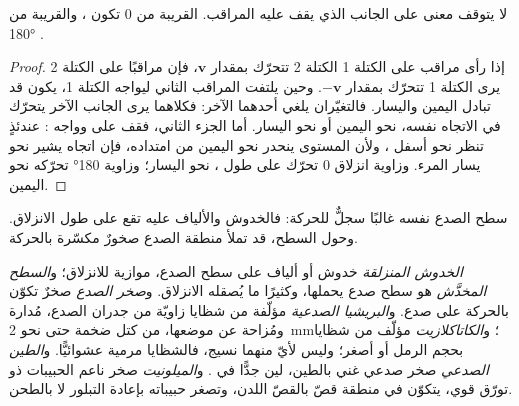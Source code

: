 \begin{proposition}\label{prop:b1:faults-folds-fabrics:sense}
لا يتوقف معنى  على الجانب الذي يقف عليه المراقب.  القريبة من $0$ تكون ، والقريبة من \ang{180} .
\end{proposition}

\begin{proof}
إذا رأى مراقب على الكتلة 1 الكتلة 2 تتحرّك بمقدار $\mathbf v$، فإن مراقبًا على الكتلة 2 يرى الكتلة 1 تتحرّك بمقدار $-\mathbf v$. وحين يلتفت المراقب الثاني ليواجه الكتلة 1، يكون قد تبادل اليمين واليسار. فالتغيّران يلغي أحدهما الآخر: فكلاهما يرى الجانب الآخر يتحرّك في الاتجاه نفسه، نحو اليمين أو نحو اليسار. أما الجزء الثاني، فقف على  وواجه : عندئذٍ تنظر نحو أسفل ، ولأن المستوى ينحدر نحو اليمين من امتداده، فإن اتجاه  يشير نحو يسار المرء. وزاوية انزلاق $0$ تحرّك  على طول ، نحو اليسار؛ وزاوية \ang{180} تحرّكه نحو اليمين.
\end{proof}

سطح الصدع نفسه غالبًا سجلٌّ للحركة: فالخدوش والألياف عليه تقع على طول الانزلاق. وحول السطح، قد تملأ منطقة الصدع صخورٌ مكسّرة بالحركة.

\begin{definition}\label{def:b1:faults-folds-fabrics:fault-rocks}
\emph{الخدوش المنزلقة} خدوش أو ألياف على سطح الصدع، موازية للانزلاق؛ و\emph{السطح المخدَّش} هو سطح صدع يحملها، وكثيرًا ما يُصقله الانزلاق. و\emph{صخر الصدع} صخرٌ تكوّن بالحركة على صدع. و\emph{البريشيا الصدعية} مؤلّفة من شظايا زاويّة من جدران الصدع، مُدارة ومُزاحة عن موضعها، من كتل ضخمة حتى نحو \qty{2}{mm}؛ و\emph{الكاتاكلازيت} مؤلّف من شظايا بحجم الرمل أو أصغر؛ وليس لأيّ منهما نسيج، فالشظايا مرمية عشوائيًّا. و\emph{الطين الصدعي} صخر صدعي غني بالطين، لين جدًّا في . و\emph{الميلونيت} صخر ناعم الحبيبات ذو تورّق قوي، يتكوّن في منطقة قصّ بالقصّ اللدن، وتصغر حبيباته بإعادة التبلور لا بالطحن.
\end{definition}

